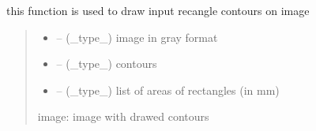 \documentclass[letterpaper,10pt,english]{sphinxmanual}
\begin{document}
\begin{savenotes}\begin{fulllineitems}
\label{\detokenize{setting/backend/pxvalue_calibration:oxin.backend.pxvalue_calibration.draw_rect}}
\pysigstartsignatures
{}
\pysigstopsignatures
\sphinxAtStartPar
this function is used to draw input recangle contours on image
\begin{quote}\begin{description}
\begin{itemize}
\item {} 
\sphinxAtStartPar
{} – (\_type\_) image in gray format

\item {} 
\sphinxAtStartPar
{} – (\_type\_) contours

\item {} 
\sphinxAtStartPar
{} – (\_type\_) list of areas of rectangles (in mm)

\end{itemize}

\sphinxAtStartPar
image: image with drawed contours

\end{description}\end{quote}

\end{fulllineitems}\end{savenotes}

\end{document}
